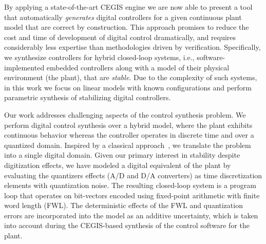 \documentclass[final]{sig-alternate-05-2015}
\begin{document}
By applying a state-of-the-art CEGIS engine we are now able to present a
tool that automatically \emph{generates} digital controllers for a given
continuous plant model that are correct by construction.  This approach
promises to reduce the cost and time of development of digital control
dramatically, and requires considerably less expertise than methodologies
driven by verification.  Specifically, we synthesize controllers for hybrid
closed-loop systems, i.e., software-implemented embedded controllers along
with a model of their physical environment (the plant), that are
\emph{stable}.  Due to the complexity of such systems, in this work we focus
on linear models with known configurations and perform parametric synthesis
of stabilizing digital controllers.

Our work addresses challenging aspects of the control synthesis
problem.  We perform digital control synthesis over a hybrid model, where
the plant exhibits continuous behavior whereas the controller operates in
discrete time and over a quantized domain.  Inspired by a classical
approach~\cite{astrom1997computer}, we translate the problem into a single
digital domain.  Given our primary interest in stability despite
digitization effects, we have modeled a digital equivalent of the plant by
evaluating the quantizers effects (A/D and D/A converters) as time
discretization elements with quantization noise.  The resulting closed-loop
system is a program loop that operates on bit-vectors encoded using
fixed-point arithmetic with finite word length (FWL).  The deterministic
effects of the FWL and quantization errors are incorporated into the model
as an additive uncertainty, which is taken into account during the
CEGIS-based synthesis of the control software for the plant.
\end{document}
